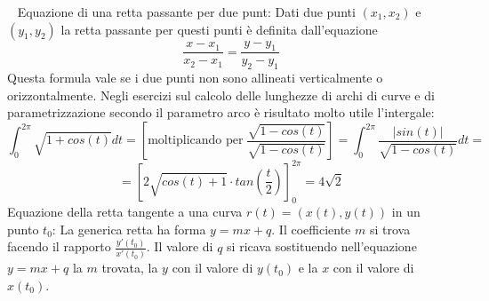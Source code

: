 \ \newline
Equazione di una retta passante per due punt:\newline
Dati due punti $(x_1, x_2)$ e $(y_1, y_2)$ la retta passante per questi punti è definita dall'equazione
\[
    \frac{x-x_1}{x_2-x_1} = \frac{y-y_1}{y_2-y_1}
\]
Questa formula vale se i due punti non sono allineati verticalmente o orizzontalmente.\newline
\newline
Negli esercizi sul calcolo delle lunghezze di archi di curve e di parametrizzazione secondo il parametro arco è risultato molto utile l'intergale:
\[
    \int_{0}^{2\pi} \sqrt{1 + cos(t)}dt = \left[\text{moltiplicando per} \; \frac{\sqrt{1-cos(t)}}{\sqrt{1-cos(t)}}\right] = \int_{0}^{2\pi}\frac{|sin(t)|}{\sqrt{1-cos(t)}}dt =
\]
\[
    = [2 \sqrt{cos(t) +1}\cdot  tan(\frac{t}{2}) ]_0^{2\pi} = 4 \sqrt{2}
\]
Equazione della retta tangente a una curva $r(t) = (x(t), y(t))$ in un punto $t_0$:\newline
La generica retta ha forma $y = mx +q$. \newline
Il coefficiente $m$ si trova facendo il rapporto $\frac{y'(t_0)}{x'(t_0)}$.\newline
Il valore di $q$ si ricava sostituendo nell'equazione $y = mx +q$ la $m$ trovata, la $y$ con il valore di $y(t_0)$ e la $x$ con il valore di $x(t_0)$.